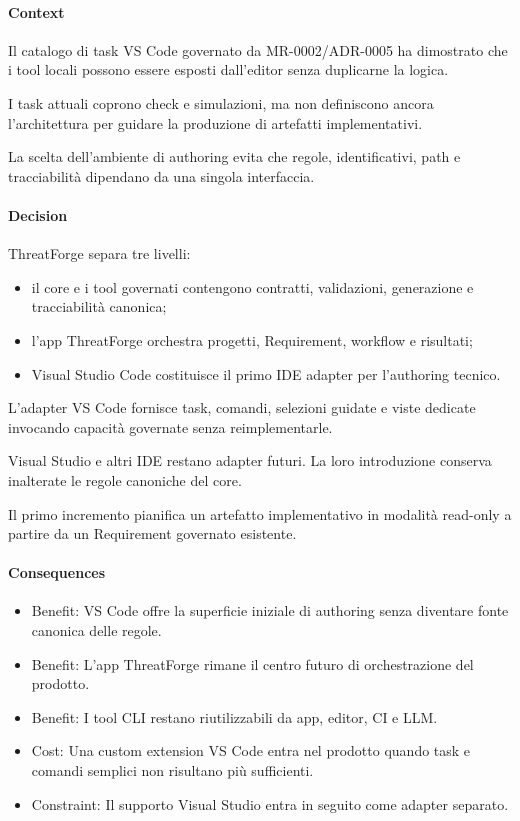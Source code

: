 \documentclass[
  10pt,
]{article}
\providecommand{\tightlist}{%
  \setlength{\itemsep}{0pt}\setlength{\parskip}{0pt}}
\begin{document}
\paragraph{Context}\label{context-18}

Il catalogo di task VS Code governato da MR-0002/ADR-0005 ha dimostrato
che i tool locali possono essere esposti dall'editor senza duplicarne la
logica.

I task attuali coprono check e simulazioni, ma non definiscono ancora
l'architettura per guidare la produzione di artefatti implementativi.

La scelta dell'ambiente di authoring evita che regole, identificativi,
path e tracciabilità dipendano da una singola interfaccia.

\paragraph{Decision}\label{decision-18}

ThreatForge separa tre livelli:

\begin{itemize}
\tightlist
\item
  il core e i tool governati contengono contratti, validazioni,
  generazione e tracciabilità canonica;
\item
  l'app ThreatForge orchestra progetti, Requirement, workflow e
  risultati;
\item
  Visual Studio Code costituisce il primo IDE adapter per l'authoring
  tecnico.
\end{itemize}

L'adapter VS Code fornisce task, comandi, selezioni guidate e viste
dedicate invocando capacità governate senza reimplementarle.

Visual Studio e altri IDE restano adapter futuri. La loro introduzione
conserva inalterate le regole canoniche del core.

Il primo incremento pianifica un artefatto implementativo in modalità
read-only a partire da un Requirement governato esistente.

\paragraph{Consequences}\label{consequences-18}

\begin{itemize}
\tightlist
\item
  Benefit: VS Code offre la superficie iniziale di authoring senza
  diventare fonte canonica delle regole.
\item
  Benefit: L'app ThreatForge rimane il centro futuro di orchestrazione
  del prodotto.
\item
  Benefit: I tool CLI restano riutilizzabili da app, editor, CI e LLM.
\item
  Cost: Una custom extension VS Code entra nel prodotto quando task e
  comandi semplici non risultano più sufficienti.
\item
  Constraint: Il supporto Visual Studio entra in seguito come adapter
  separato.
\end{itemize}
\end{document}
